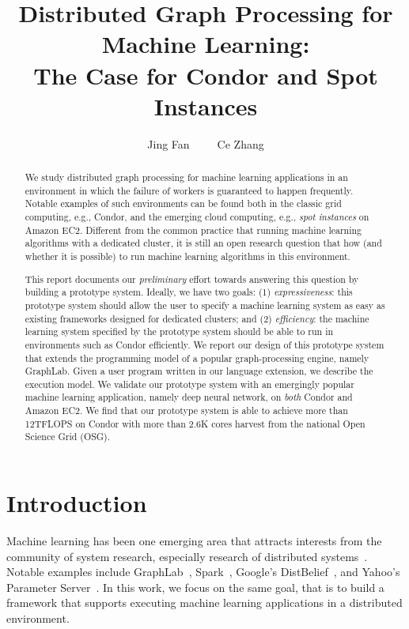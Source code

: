 \documentclass[11pt]{article}
\title{Distributed Graph Processing for Machine Learning:\\
The Case for Condor and Spot Instances}
\author{Jing Fan~~~~~Ce Zhang}
\date{}
\begin{document}
\maketitle

\begin{abstract}
We study distributed graph processing for machine learning
applications in an environment
in which the failure of workers is guaranteed to happen
frequently. Notable examples of such environments can be found
both in the classic grid computing, e.g., Condor, and the emerging
cloud computing, e.g., {\em spot instances} on Amazon EC2.
Different from the common practice that running
machine learning algorithms with a dedicated cluster,
it is still an open research question that how (and whether
it is possible) to run machine learning algorithms in
this environment.

This report documents our {\em preliminary} effort towards 
answering this question by building a prototype system. 
Ideally, we have two goals: (1) {\em expressiveness}:
this prototype system should allow the user to specify
a machine learning system as easy as existing frameworks
designed for dedicated clusters; and (2) {\em efficiency}:
the machine learning system specified by the prototype system
should be able to run in environments such as Condor efficiently.
We report our design of this prototype system that extends
the programming model of a popular graph-processing engine,
namely GraphLab. Given a user program written in our language
extension, we describe the execution model. We validate
our prototype system with an emergingly popular machine
learning application, namely deep neural network, on {\em both}
Condor and Amazon EC2. We find that our prototype system is
able to achieve more than 12TFLOPS on Condor with more than
2.6K cores harvest from the national Open Science Grid (OSG).

\end{abstract}

\section{Introduction}

Machine learning has been one emerging area that
attracts interests from the community of system 
research, especially research of 
distributed systems~\cite{Li:2014:OSDI,GraphLab:OSDI,Spark,Google,Yahoo}. 
Notable examples include GraphLab~\cite{GraphLab:OSDI},
Spark~\cite{Spark}, Google's DistBelief~\cite{Google}, and 
Yahoo's Parameter Server~\cite{Yahoo,Li:2014:OSDI}. 
In this work, we focus on the same goal, that is 
to build a framework that supports executing machine 
learning applications in a distributed environment.
\end{document}
